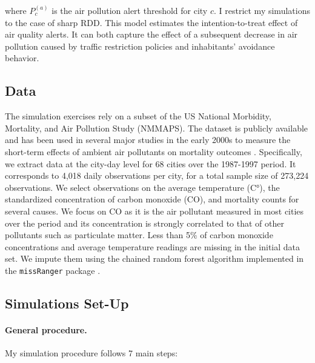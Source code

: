 \documentclass[12pt]{article}
\begin{document}
        \noindent where $P^{(a)}_{c}$ is the air pollution alert threshold for city $c$. I restrict my simulations to the case of sharp RDD. This model estimates the intention-to-treat effect of air quality alerts.  It can both capture the effect of a subsequent decrease in air pollution caused by traffic restriction policies and inhabitants' avoidance behavior. 
        
        \subsection{Data}
        
        The simulation exercises rely on a subset of the US National Morbidity, Mortality, and Air Pollution Study (NMMAPS). The dataset is publicly available and has been used in several major studies in the early 2000s to measure the short-term effects of ambient air pollutants on mortality outcomes \citep{peng2008statistical}. Specifically, we extract data at the city-day level for 68 cities over the 1987-1997 period. It corresponds to 4,018 daily observations per city, for a total sample size of 273,224 observations. We select observations on the average temperature (C°), the standardized concentration of carbon monoxide (CO), and mortality counts for several causes. We focus on CO as it is the air pollutant measured in most cities over the period and its concentration is strongly correlated to that of other pollutants such as particulate matter. Less than 5\% of carbon monoxide concentrations and average temperature readings are missing in the initial data set. We impute them using the chained random forest algorithm implemented in the \texttt{missRanger} package \citep{mayer_missranger_2019}.
        
        \subsection{Simulations Set-Up}
        
        \paragraph{General procedure.} My simulation procedure follows 7 main steps:
        
\end{document}
